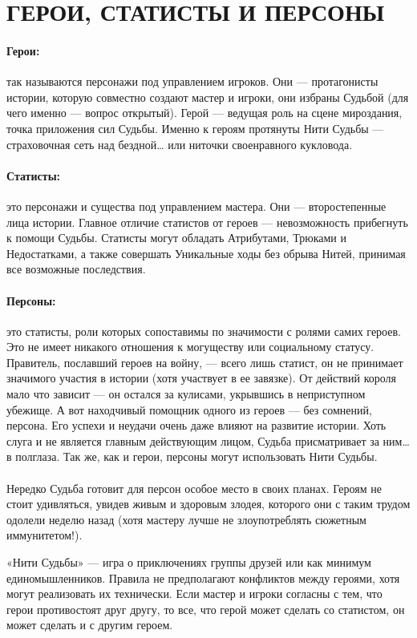 \section{ГЕРОИ, СТАТИСТЫ И ПЕРСОНЫ}
\paragraph{Герои:} так называются персонажи под управлением игроков. Они — протагонисты истории, которую совместно создают мастер и игроки, они избраны Судьбой (для чего именно — вопрос открытый). Герой — ведущая роль на сцене мироздания, точка приложения сил Судьбы. Именно к героям протянуты Нити Судьбы — страховочная сеть над бездной… или ниточки своенравного кукловода.
\paragraph{Статисты:} это персонажи и существа под управлением мастера. Они — второстепенные лица истории. Главное отличие статистов от героев — невозможность прибегнуть к помощи Судьбы. Статисты могут обладать Атрибутами, Трюками и Недостатками, а также совершать Уникальные ходы без обрыва Нитей, принимая все возможные последствия.
\paragraph{Персоны:} это статисты, роли которых сопоставимы по значимости с ролями самих героев. Это не имеет никакого отношения к могуществу или социальному статусу. Правитель, пославший героев на войну, — всего лишь статист, он не принимает значимого участия в истории (хотя участвует в ее завязке). От действий короля мало что зависит — он остался за кулисами, укрывшись в неприступном убежище. А вот находчивый помощник одного из героев — без сомнений, персона. Его успехи и неудачи очень даже влияют на развитие истории. Хоть слуга и не является главным действующим лицом, Судьба присматривает за ним… в полглаза. Так же, как и герои, персоны могут использовать Нити Судьбы. 
\paragraph{}
Нередко Судьба готовит для персон особое место в своих планах. Героям не стоит удивляться, увидев живым и здоровым злодея, которого они с таким трудом одолели неделю назад (хотя мастеру лучше не злоупотреблять сюжетным иммунитетом!).

«Нити Судьбы» — игра о приключениях группы друзей или как минимум единомышленников. Правила не предполагают конфликтов между героями, хотя могут реализовать их технически. Если мастер и игроки согласны с тем, что герои противостоят друг другу, то все, что герой может сделать со статистом, он может сделать и с другим героем.
